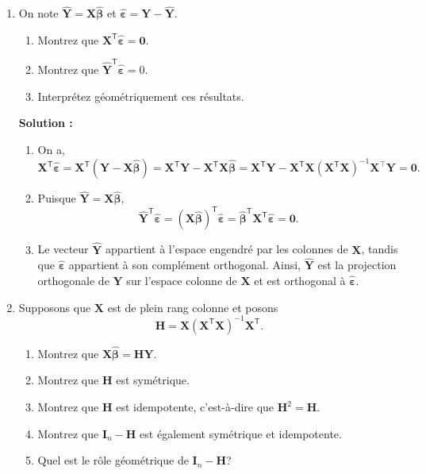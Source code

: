 \documentclass[letter, 11pt]{article}
\newcommand{\bY}{\mathbf{Y}}
\newcommand{\bX}{\mathbf{X}}
\newcommand{\bbeta}{\boldsymbol{\beta}}
\newcommand{\bepsilon}{\boldsymbol{\varepsilon}}
\newcommand{\bH}{\mathbf{H}}
\newcommand{\trans}{^{\mathsf T}}
\newcommand{\prof}[1]{\ifdefined\avecsolutions\par{\color{blue}\textbf{Solution :} #1}\par\fi}
\begin{document}
\begin{enumerate}[leftmargin=*, wide, label=\bf Exercice \arabic*:]

\item On note $\widehat{\bY}=\bX\widehat{\bbeta}$ et
$\widehat{\bepsilon}=\bY-\widehat{\bY}$.

\begin{enumerate}[label=\alph*)]
  \item Montrez que
        $\bX\trans\widehat{\bepsilon}=\mathbf{0}$.
    \item Montrez que $\widehat{\bY}\trans\widehat{\bepsilon}=0$.
  \item Interprétez géométriquement ces résultats.
\end{enumerate}

\prof{
\begin{enumerate}[label=\alph*)]
  \item On a,
        \[
        \bX\trans\widehat{\bepsilon}
        =\bX\trans(\bY-\bX\widehat{\bbeta})
        =\bX\trans\bY-\bX\trans\bX\widehat{\bbeta}
        =\bX\trans\bY-\bX\trans\bX(\bX\trans\bX)^{-1}\bX^\top\bY
        =\mathbf{0}.
        \]

   \item Puisque $\widehat{\bY}=\bX\widehat{\bbeta}$,
        \[
        \widehat{\bY}\trans\widehat{\bepsilon}
        =(\bX\widehat{\bbeta})\trans\widehat{\bepsilon}
        =\widehat{\bbeta}\trans\bX\trans\widehat{\bepsilon}
        =\mathbf{0}.
        \]

  \item Le vecteur $\widehat{\bY}$ appartient à l'espace engendré par les
        colonnes de $\bX$, tandis que $\widehat{\bepsilon}$ appartient à son
        complément orthogonal. Ainsi, $\widehat{\bY}$ est la projection
        orthogonale de $\bY$ sur l'espace colonne de $\bX$ et est orthogonal à $\widehat{\bepsilon}$.
\end{enumerate}
}


\item Supposons que $\bX$ est de plein rang colonne et posons
\[
  \bH=\bX(\bX\trans\bX)^{-1}\bX\trans.
\]

\begin{enumerate}[label=\alph*)]
  \item Montrez que $\bX\widehat{\bbeta}=\bH\bY$.
  \item Montrez que $\bH$ est symétrique.
  \item Montrez que $\bH$ est idempotente, c'est-à-dire que
        $\bH^2=\bH$.
  \item Montrez que $\mathbf{I}_n-\bH$ est également symétrique et idempotente.
  \item Quel est le rôle géométrique de $\mathbf{I}_n-\bH$?
\end{enumerate}


\end{enumerate}
\end{document}
